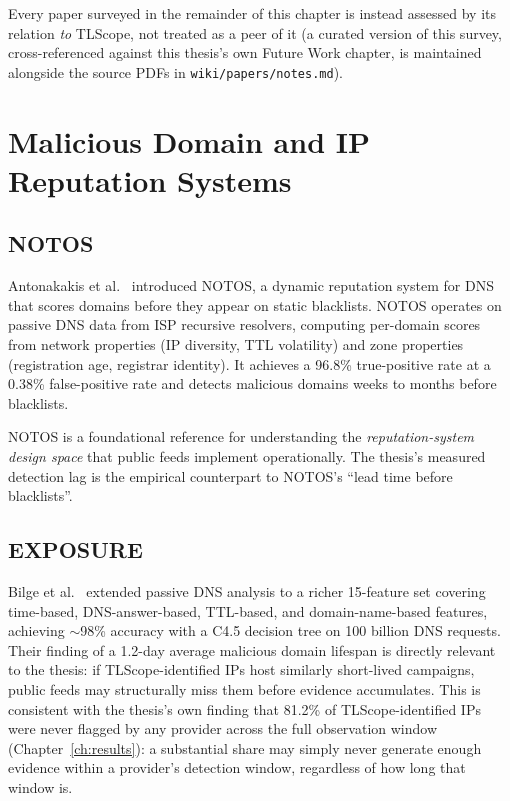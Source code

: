 \documentclass[12pt, a4paper, twoside]{report}
\begin{document}
Every paper surveyed in the remainder of this chapter is instead assessed by its relation
\emph{to} TLScope, not treated as a peer of it (a curated version of this survey, cross-referenced
against this thesis's own Future Work chapter, is maintained alongside the source PDFs in
\texttt{wiki/papers/notes.md}).

\section{Malicious Domain and IP Reputation Systems}

\subsection{NOTOS}

Antonakakis et al.\ \cite{antonakakis2010notos} introduced NOTOS, a dynamic reputation system for
DNS that scores domains before they appear on static blacklists. NOTOS operates on passive DNS data
from ISP recursive resolvers, computing per-domain scores from network properties (IP diversity,
TTL volatility) and zone properties (registration age, registrar identity). It achieves a 96.8\%
true-positive rate at a 0.38\% false-positive rate and detects malicious domains weeks to months
before blacklists.

NOTOS is a foundational reference for understanding the \emph{reputation-system design space} that
public feeds implement operationally. The thesis's measured detection lag is the empirical
counterpart to NOTOS's ``lead time before blacklists''.

\subsection{EXPOSURE}

Bilge et al.\ \cite{bilge2011exposure} extended passive DNS analysis to a richer 15-feature set
covering time-based, DNS-answer-based, TTL-based, and domain-name-based features, achieving
$\sim$98\% accuracy with a C4.5 decision tree on 100 billion DNS requests. Their finding of a
1.2-day average malicious domain lifespan is directly relevant to the thesis: if TLScope-identified
IPs host similarly short-lived campaigns, public feeds may structurally miss them before evidence
accumulates. This is consistent with the thesis's own finding that 81.2\% of TLScope-identified IPs
were never flagged by any provider across the full observation window
(Chapter~\ref{ch:results}): a substantial share may simply never generate enough evidence within
a provider's detection window, regardless of how long that window is.
\end{document}

